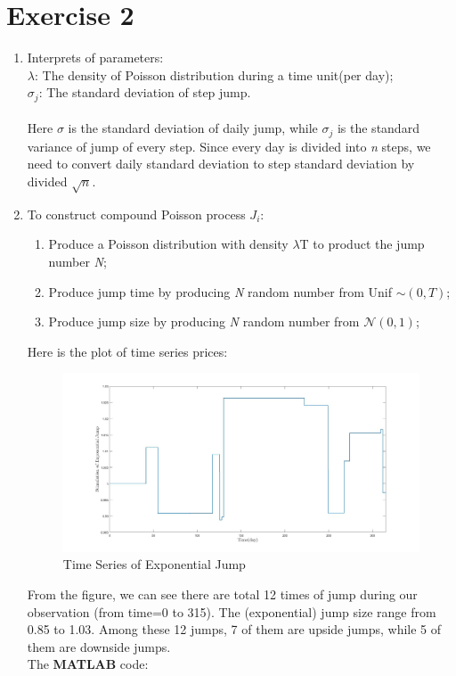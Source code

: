 \documentclass[12pt,letterpaper]{article}
\begin{document}
\section*{Exercise 2}
  \begin{enumerate}[label=\textbf{(\Alph*)}]
  \item Interprets of parameters:\\
 	      \emph{$\lambda$}: The density of Poisson distribution during a time unit(per day);\\
 	      \emph{$\sigma_j$}: The standard deviation of step jump.\\
 	      \\
 	      Here $\sigma$ is the standard deviation of daily jump, while $\sigma_j$ is the standard variance of jump of every step. Since every day is divided into \emph{n} steps, we need to convert daily standard deviation to step standard deviation by divided $\sqrt{n}$.
  \item To construct compound Poisson process $J_i$:
      \begin{enumerate}[label=(\roman*)]
  	    \item Produce a Poisson distribution with density $\lambda$T to product the jump number \emph{N};
  	    \item Produce jump time by producing \emph{N} random number from Unif $\sim (0,T)$;
      	\item Produce jump size by producing \emph{N} random number from $\mathcal{N}(0,1)$;
      \end{enumerate}
 
Here is the plot of time series prices:
        \begin{figure}[H]
            \centering
            \includegraphics[width=15cm]{figures/p1_ex2.jpg}
            \caption{Time Series of Exponential Jump}
            \label{fig:2}
        \end{figure}
From the figure, we can see there are total 12 times of jump during our observation (from time=0 to 315). The (exponential) jump size range from 0.85 to 1.03. Among these 12 jumps, 7 of them are upside jumps, while 5 of them are downside jumps.\\
 
  The \textbf{MATLAB} code:
  
  
  
\end{enumerate}
\newpage
\end{document}

